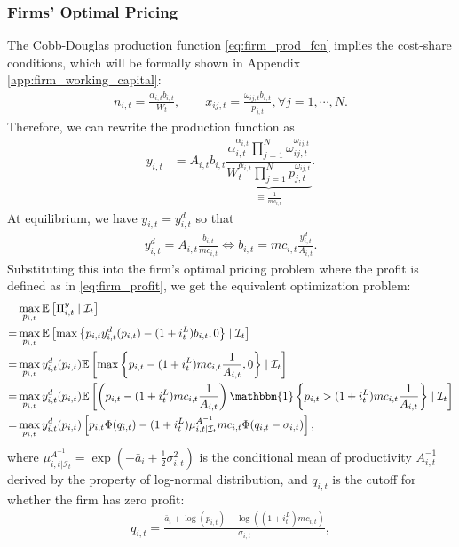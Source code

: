 \documentclass[12pt]{article}
\numberwithin{equation}{section}
\begin{document}
\begin{appendix}
\subsubsection{Firms' Optimal Pricing}\label{app:firm_pricing}
The Cobb-Douglas production function \eqref{eq:firm_prod_fcn} implies the cost-share conditions, which will be formally shown in Appendix \ref{app:firm_working_capital}:
\begin{align*}
    n_{i,t} = \frac{\alpha_{i,t} b_{i,t}}{W_t}, \qquad x_{ij,t} = \frac{\omega_{ij,t} b_{i,t}}{p_{j,t}}, \forall j = 1, \cdots, N.
\end{align*}
Therefore, we can rewrite the production function as
\begin{align*}
    y_{i,t} &= A_{i,t} b_{i,t} \underbrace{\dfrac{\alpha_{i,t}^{\alpha_{i,t}} \prod_{j=1}^N \omega_{ij,t}^{\omega_{ij,t}}}{W_t^{\alpha_{i,t}} \prod_{j=1}^N p_{j,t}^{\omega_{ij,t}}}}_{\equiv \frac{1}{{mc}_{i,t}}}.
\end{align*}
At equilibrium, we have $y_{i,t} = y^d_{i,t}$ so that
\begin{align*}
    y^d_{i,t} = A_{i,t} \frac{b_{i,t}}{{mc}_{i,t}} \iff b_{i,t} = {mc}_{i,t} \frac{y^d_{i,t}}{A_{i,t}}.
\end{align*}
Substituting this into the firm's optimal pricing problem where the profit is defined as in \eqref{eq:firm_profit}, we get the equivalent optimization problem:
\begin{align*}
    &\max_{p_{i,t}} \mathbb{E}\left[\Pi^y_{i,t} \mid \mathcal{I}_t\right]\\
    = &\max_{p_{i,t}} \mathbb{E}\left[\max \left\{p_{i,t} y^d_{i,t}(p_{i,t}) - (1+ i^L_t)b_{i,t}, 0\right\}\mid \mathcal{I}_t\right]\\
    = &\max_{p_{i,t}} y^d_{i,t}(p_{i,t})\mathbb{E}\left[\max \left\{p_{i,t} - (1+ i^L_t){mc}_{i,t}\frac{1}{A_{i,t}}, 0\right\}\mid \mathcal{I}_t\right]\\
    = &\max_{p_{i,t}} y^d_{i,t}(p_{i,t}) \mathbb{E}\left[ \left(p_{i,t} - (1+ i^L_t){mc}_{i,t}\frac{1}{A_{i,t}}\right) \mathbbm{1}\left\{p_{i,t} > (1+ i^L_t){mc}_{i,t}\frac{1}{A_{i,t}}\right\}\mid \mathcal{I}_t\right]\\
    = &\max_{p_{i,t}} y^d_{i,t}(p_{i,t}) \left[ p_{i,t} \Phi(q_{i,t}) - (1+i^L_t) \mu^{A^{-1}}_{i,t | \mathcal{I}_t} {mc}_{i,t} \Phi(q_{i,t} - \sigma_{i,t}) \right],
\end{align*}
where $\mu^{A^{-1}}_{i,t | \mathcal{I}_t} = \exp \left(-\bar{a}_i + \frac12 \sigma_{i,t}^2 \right)$ is the conditional mean of productivity $A^{-1}_{i,t}$ derived by the property of log-normal distribution, and $q_{i,t}$ is the cutoff for whether the firm has zero profit:
\begin{align*}
    q_{i,t} = \frac{\bar a_i + \log(p_{i,t}) - \log \left((1+i^L_t){mc}_{i,t}\right)}{\sigma_{i,t}},
\end{align*}



\end{appendix}
\end{document}
